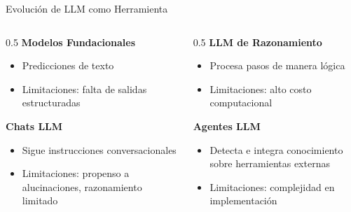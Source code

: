 \begin{frame}{Evolución de LLM como Herramienta}
  \begin{columns}[T]
    \begin{column}{0.5\textwidth}
      \textbf{Modelos Fundacionales}
      \begin{itemize}
        \item Predicciones de texto
        \item Limitaciones: falta de salidas estructuradas
      \end{itemize}
      \vspace{0.3cm}
      \textbf{Chats LLM}
      \begin{itemize}
        \item Sigue instrucciones conversacionales
        \item Limitaciones: propenso a alucinaciones, razonamiento limitado
      \end{itemize}
    \end{column}
    \begin{column}{0.5\textwidth}
      \textbf{LLM de Razonamiento}
      \begin{itemize}
        \item Procesa pasos de manera lógica
        \item Limitaciones: alto costo computacional
      \end{itemize}
      \vspace{0.3cm}
      \textbf{Agentes LLM}
      \begin{itemize}
        \item Detecta e integra conocimiento sobre herramientas externas
        \item Limitaciones: complejidad en implementación
      \end{itemize}
    \end{column}
  \end{columns}
\end{frame}

